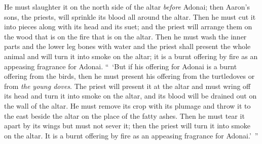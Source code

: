 \begin{biblechapter}
\verse He must slaughter it on the north side of the altar \textit{before} Adonai; then Aaron’s sons, the priests, will sprinkle its blood all around the altar.
\verse Then he must cut it into pieces along with its head and its suet; and the priest will arrange them on the wood that is on the fire that is on the altar.
\verse Then he must wash the inner parts and the lower leg bones with water and the priest shall present the whole animal and will turn it into smoke on the altar; it is a burnt offering by fire as an appeasing fragrance for Adonai.
\verse “ ‘But if his offering for Adonai is a burnt offering from the birds, then he must present his offering from the turtledoves or from \textit{the young doves}.
\verse The priest will present it at the altar and must wring off its head and turn it into smoke on the altar, and its blood will be drained out on the wall of the altar.
\verse He must remove its crop with its plumage and throw it to the east beside the altar on the place of the fatty ashes.
\verse Then he must tear it apart by its wings but must not sever it; then the priest will turn it into smoke on the altar. It is a burnt offering by fire as an appeasing fragrance for Adonai.’ ”
\end{biblechapter}

